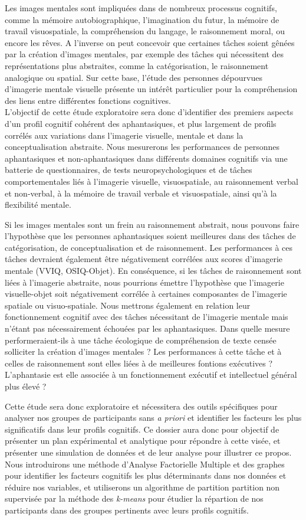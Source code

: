 \documentclass[
  12pt,
]{article}
\begin{document}
Les images mentales sont impliquées dans de nombreux processus
cognitifs, comme la mémoire autobiographique, l'imagination du futur, la
mémoire de travail visuospatiale, la compréhension du langage, le
raisonnement moral, ou encore les rêves. A l'inverse on peut concevoir
que certaines tâches soient gênées par la création d'images mentales,
par exemple des tâches qui nécessitent des représentations plus
abstraites, comme la catégorisation, le raisonnement analogique ou
spatial. Sur cette base, l'étude des personnes dépourvues d'imagerie
mentale visuelle présente un intérêt particulier pour la compréhension
des liens entre différentes fonctions cognitives.\\
L'objectif de cette étude exploratoire sera donc d'identifier des
premiers aspects d'un profil cognitif cohérent des aphantasiques, et
plus largement de profils corrélés aux variations dans l'imagerie
visuelle, mentale et dans la conceptualisation abstraite. Nous
mesurerons les performances de personnes aphantasiques et
non-aphantasiques dans différents domaines cognitifs via une batterie de
questionnaires, de tests neuropsychologiques et de tâches
comportementales liés à l'imagerie visuelle, visuospatiale, au
raisonnement verbal et non-verbal, à la mémoire de travail verbale et
visuospatiale, ainsi qu'à la flexibilité mentale.

Si les images mentales sont un frein au raisonnement abstrait, nous
pouvons faire l'hypothèse que les personnes aphantasiques soient
meilleures dans des tâches de catégorisation, de conceptualisation et de
raisonnement. Les performances à ces tâches devraient également être
négativement corrélées aux scores d'imagerie mentale (VVIQ, OSIQ-Objet).
En conséquence, si les tâches de raisonnement sont liées à l'imagerie
abstraite, nous pourrions émettre l'hypothèse que l'imagerie
visuelle-objet soit négativement corrélée à certaines composantes de
l'imagerie spatiale ou visuo-spatiale. Nous mettrons également en
relation leur fonctionnement cognitif avec des tâches nécessitant de
l'imagerie mentale mais n'étant pas nécessairement échouées par les
aphantasiques. Dans quelle mesure performeraient-ils à une tâche
écologique de compréhension de texte censée solliciter la création
d'images mentales ? Les performances à cette tâche et à celles de
raisonnement sont elles liées à de meilleures fontions exécutives ?
L'aphantasie est elle associée à un fonctionnement exécutif et
intellectuel général plus élevé ?

Cette étude sera donc exploratoire et nécessitera des outils spécifiques
pour analyser nos groupes de participants sans \emph{a priori} et
identifier les facteurs les plus significatifs dans leur profils
cognitifs. Ce dossier aura donc pour objectif de présenter un plan
expérimental et analytique pour répondre à cette visée, et présenter une
simulation de données et de leur analyse pour illustrer ce propos. Nous
introduirons une méthode d'Analyse Factorielle Multiple et des graphes
pour identifier les facteurs cognitifs les plus déterminants dans nos
données et réduire nos variables, et utiliserons un algorithme de
partition partition non supervisée par la méthode des \emph{k-means}
pour étudier la répartion de nos participants dans des groupes
pertinents avec leurs profils cognitifs.
\end{document}
